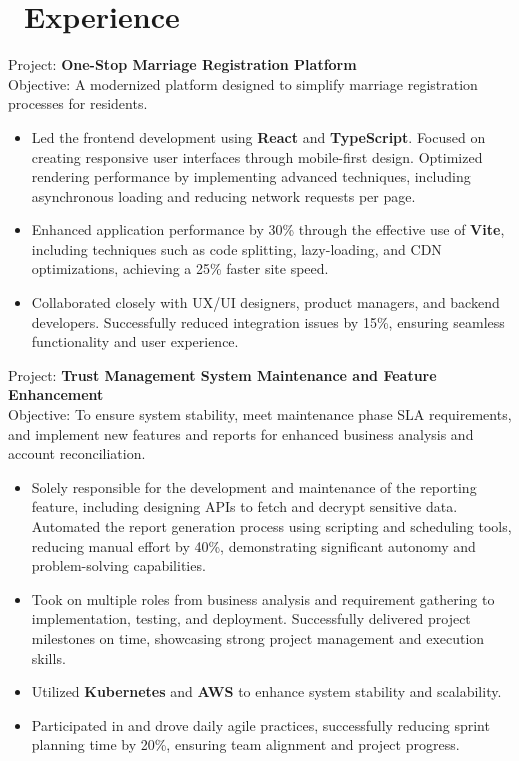 \documentclass{resume}
\begin{document}
\onehalfspacing
{}



\section{\faUsers\ Experience}
\role{Software Developer}

Project: \textbf{One-Stop Marriage Registration Platform} \\
Objective: A modernized platform designed to simplify marriage registration processes for residents.
\begin{itemize}
  \item Led the frontend development using \textbf{React} and \textbf{TypeScript}. Focused on creating responsive user interfaces through mobile-first design. Optimized rendering performance by implementing advanced techniques, including asynchronous loading and reducing network requests per page.
  \item Enhanced application performance by 30\% through the effective use of \textbf{Vite}, including techniques such as code splitting, lazy-loading, and CDN optimizations, achieving a 25\% faster site speed.
  \item Collaborated closely with UX/UI designers, product managers, and backend developers. Successfully reduced integration issues by 15\%, ensuring seamless functionality and user experience.
\end{itemize}

Project: \textbf{Trust Management System Maintenance and Feature Enhancement} \\
Objective: To ensure system stability, meet maintenance phase SLA requirements, and implement new features and reports for enhanced business analysis and account reconciliation.
\begin{itemize}
  \item Solely responsible for the development and maintenance of the reporting feature, including designing APIs to fetch and decrypt sensitive data. Automated the report generation process using scripting and scheduling tools, reducing manual effort by 40\%, demonstrating significant autonomy and problem-solving capabilities.
  \item Took on multiple roles from business analysis and requirement gathering to implementation, testing, and deployment. Successfully delivered project milestones on time, showcasing strong project management and execution skills.
  \item Utilized \textbf{Kubernetes} and \textbf{AWS} to enhance system stability and scalability.
  \item Participated in and drove daily agile practices, successfully reducing sprint planning time by 20\%, ensuring team alignment and project progress.
\end{itemize}
\end{document}
